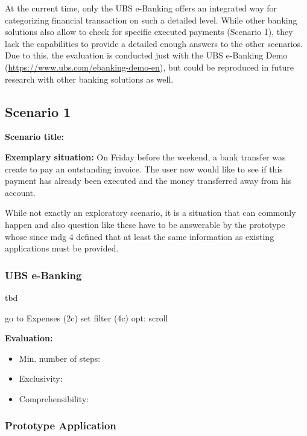 At the current time, only the UBS e-Banking offers an integrated way for categorizing financial transaction on such a detailed level. While other banking solutions also allow to check for specific executed payments (Scenario 1), they lack the capabilities to provide a detailed enough answers to the other scenarios. Due to this, the evaluation is conducted just with the UBS e-Banking Demo (\url{https://www.ubs.com/ebanking-demo-en}), but could be reproduced in future research with other banking solutions as well.


\subsection{Scenario 1}

\textbf{Scenario title:} \scenone

\textbf{Exemplary situation:} On Friday before the weekend, a bank transfer was create to pay an outstanding invoice. The user now would like to see if this payment has already been executed and the money transferred away from his account. 

While not exactly an exploratory scenario, it is a situation that can commonly happen and also question like these have to be answerable by the prototype whose since \gls{mdg} 4 defined that at least the same information as existing applications must be provided.


\subsubsection{UBS e-Banking}

tbd

go to Expenses (2c)
set filter (4c)
opt: scroll


\textbf{Evaluation:} 
\begin{itemize}[noitemsep,nolistsep]
	\item Min. number of steps: \textbf{}
	\item Exclusivity: \textbf{}
	\item Comprehensibility: \textbf{}
\end{itemize}



\subsubsection{Prototype Application}

